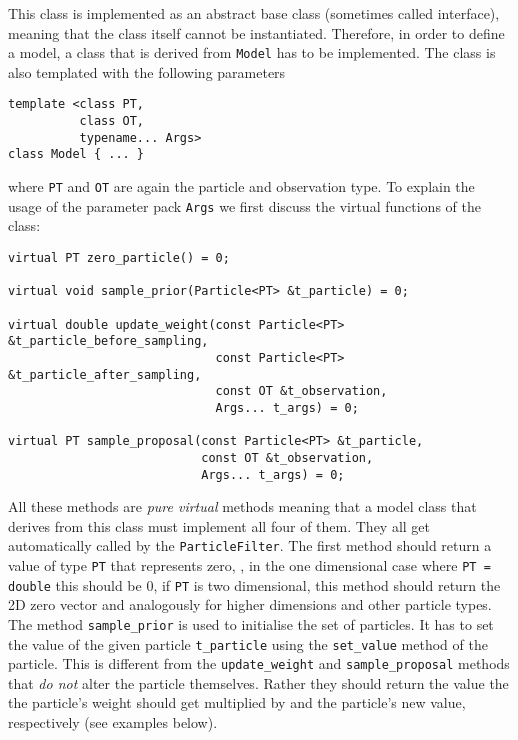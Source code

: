 This class is implemented as an abstract base class (sometimes called
interface), meaning that the class itself cannot be
instantiated. Therefore, in order to define a model, a class that is
derived from \texttt{Model} has to be implemented. The class is also
templated with the following parameters
\begin{verbatim}
template <class PT, 
          class OT, 
          typename... Args> 
class Model { ... }
\end{verbatim}
where \texttt{PT} and \texttt{OT} are again the particle and
observation type. To explain the usage of the parameter pack
\texttt{Args} we first discuss the virtual functions of the class:
\begin{verbatim}
virtual PT zero_particle() = 0;

virtual void sample_prior(Particle<PT> &t_particle) = 0;

virtual double update_weight(const Particle<PT> &t_particle_before_sampling,
                             const Particle<PT> &t_particle_after_sampling,
                             const OT &t_observation, 
                             Args... t_args) = 0;

virtual PT sample_proposal(const Particle<PT> &t_particle,
                           const OT &t_observation, 
                           Args... t_args) = 0;
\end{verbatim}
All these methods are \emph{pure virtual} methods meaning that a model
class that derives from this class must implement all four of
them. They all get automatically called by the
\texttt{ParticleFilter}. The first method should return a value of
type \texttt{PT} that represents zero, \ie, in the one dimensional
case where \texttt{PT = double} this should be 0, if \texttt{PT} is
\eg two dimensional, this method should return the 2D zero vector and
analogously for higher dimensions and other particle types. The method
\texttt{sample\_prior} is used to initialise the set of particles. It
has to set the value of the given particle \texttt{t\_particle} using
the \texttt{set\_value} method of the particle. This is different from
the \texttt{update\_weight} and \texttt{sample\_proposal} methods that
\emph{do not} alter the particle themselves. Rather they should return
the value the the particle's weight should get multiplied by and the
particle's new value, respectively (see examples below).

